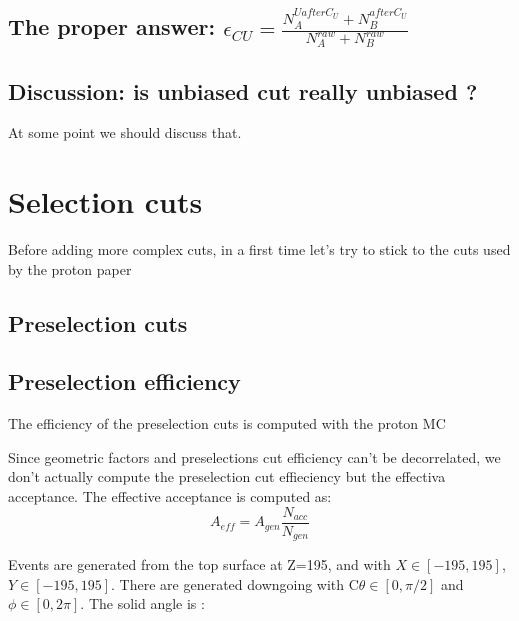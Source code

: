 \documentclass[11pt]{article}
\begin{document}
\subsection{The proper answer: $\epsilon_{CU} = \frac{N_{A}^{U after C_{U}} + N_{B}^{after C_{U}}}{N_{A}^{raw} + N_{B}^{raw}}$}
\label{sec-2-2}
\subsection{Discussion: is unbiased cut really unbiased ?}
\label{sec-2-3}

At some point we should discuss that.
\section{Selection cuts}
\label{sec-3}

Before adding more complex cuts, in a first time let's try to stick to the cuts used by the proton paper
\subsection{Preselection cuts}
\label{sec-3-1}

\subsection{Preselection efficiency}
\label{sec-3-2}

The efficiency of the preselection cuts is computed with the proton MC

Since geometric factors and preselections cut efficiency can't be decorrelated, we don't actually compute the preselection cut effieciency but the effectiva acceptance.
The effective acceptance is computed as:
\[
  A_{eff} = A_{gen} \frac{N_{acc}}{N_{gen}}
\]

Events are generated from the top surface at Z=195, and with $X \in [-195,195]$, $Y \in [-195,195]$.
There are generated downgoing with C$\theta \in [0,\pi/2]$ and $\phi \in [0, 2 \pi]$.
The solid angle is :
\end{document}
